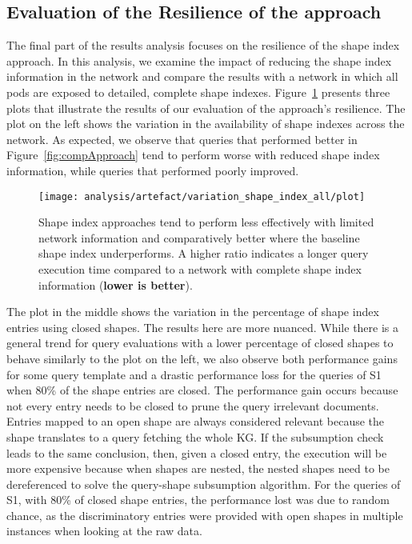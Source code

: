 \subsection{Evaluation of the Resilience of the approach}

The final part of the results analysis focuses on the resilience of the shape index approach.
In this analysis, we examine the impact of reducing the shape index information in the network and compare the results with a network in which all pods are exposed to detailed, complete shape indexes.
Figure~\ref{fig:adaptShapeIndex} presents three plots that illustrate the results of our evaluation of the approach's resilience.
The plot on the left shows the variation in the availability of shape indexes across the network. 
As expected, we observe that queries that performed better in Figure~\ref{fig:compApproach} tend to perform worse with reduced shape index information, while queries that performed poorly improved. 


\begin{figure}
    \centering
    \texttt{[image: analysis/artefact/variation\_shape\_index\_all/plot]}
    \caption{
    Shape index approaches tend to perform less effectively with limited network information and comparatively better where the baseline shape index underperforms.
    A higher ratio indicates a longer query execution time compared to a network with complete shape index information (\textbf{lower is better}).
    }
    \label{fig:adaptShapeIndex}
\end{figure}


The plot in the middle shows the variation in the percentage of shape index entries using closed shapes.
The results here are more nuanced.
While there is a general trend for query evaluations with a lower percentage of closed shapes to behave similarly to the plot on the left, we also observe both performance gains for some query template and a drastic performance loss for the queries of S1 when 80\% of the shape entries are closed.
The performance gain occurs because not every entry needs to be closed to prune the query irrelevant documents.
Entries mapped to an open shape are always considered relevant because the shape translates to a query fetching the whole KG.
If the subsumption check leads to the same conclusion, then, given a closed entry, the execution will be more expensive because 
when shapes are nested, the nested shapes need to be dereferenced to solve the query-shape subsumption algorithm.
For the queries of S1, with 80\% of closed shape entries, the performance lost was due to random chance, as the discriminatory entries were provided with open shapes in multiple instances when looking at the raw data.

